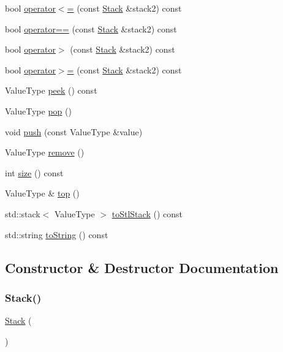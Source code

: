 \begin{DoxyCompactItemize}
\item 
bool \mbox{\hyperlink{classStack_a8037a3a4cc044bcfba994893d6f4ab12}{operator$<$=}} (const \mbox{\hyperlink{classStack}{Stack}} \&stack2) const
\item 
bool \mbox{\hyperlink{classStack_ade246b6899202c53b8fd8fbe4930b09a}{operator==}} (const \mbox{\hyperlink{classStack}{Stack}} \&stack2) const
\item 
bool \mbox{\hyperlink{classStack_a5031b32af5984055de8e2bdd4f7312c4}{operator$>$}} (const \mbox{\hyperlink{classStack}{Stack}} \&stack2) const
\item 
bool \mbox{\hyperlink{classStack_ad2ffb92607a0ad29b040677a695ccea8}{operator$>$=}} (const \mbox{\hyperlink{classStack}{Stack}} \&stack2) const
\item 
Value\+Type \mbox{\hyperlink{classStack_a7fcf31135d35acfa8ab1174c44bf28f3}{peek}} () const
\item 
Value\+Type \mbox{\hyperlink{classStack_a278630d7ff14886cdbc3585527e91733}{pop}} ()
\item 
void \mbox{\hyperlink{classStack_a3fa54a00594a4b33b29b45c98c9f6ed4}{push}} (const Value\+Type \&value)
\item 
Value\+Type \mbox{\hyperlink{classStack_a025ec97fa5b04552f5ad0902c1f02ac1}{remove}} ()
\item 
int \mbox{\hyperlink{classStack_af9593d4a5ff4274efaf429cb4f9e57cc}{size}} () const
\item 
Value\+Type \& \mbox{\hyperlink{classStack_af4e7b293e5989a3737c116dbf8f4eaf2}{top}} ()
\item 
std\+::stack$<$ Value\+Type $>$ \mbox{\hyperlink{classStack_a3a9d23b9230220abe769aa0ee5972498}{to\+Stl\+Stack}} () const
\item 
std\+::string \mbox{\hyperlink{classStack_a1fe5121d6528fdea3f243321b3fa3a49}{to\+String}} () const
\end{DoxyCompactItemize}


\subsection{Constructor \& Destructor Documentation}
\mbox{\label{classStack_a7bda4597c418045448855db1ad87dbc5}} 
\subsubsection{\texorpdfstring{Stack()}{Stack()}\hspace{0.1cm}{\footnotesize\ttfamily [1/2]}}
{\footnotesize\ttfamily \mbox{\hyperlink{classStack}{Stack}} (\begin{DoxyParamCaption}{ }\end{DoxyParamCaption})}

